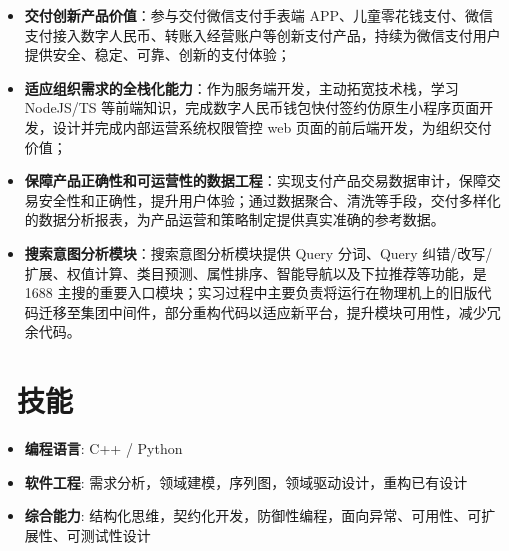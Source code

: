 \documentclass{resume}
\begin{document}
\begin{itemize}
  \item \textbf{交付创新产品价值}：参与交付微信支付手表端 APP、儿童零花钱支付、微信支付接入数字人民币、转账入经营账户等创新支付产品，持续为微信支付用户提供安全、稳定、可靠、创新的支付体验；
  \item \textbf{适应组织需求的全栈化能力}：作为服务端开发，主动拓宽技术栈，学习 NodeJS/TS 等前端知识，完成数字人民币钱包快付签约仿原生小程序页面开发，设计并完成内部运营系统权限管控 web 页面的前后端开发，为组织交付价值；
  \item \textbf{保障产品正确性和可运营性的数据工程}：实现支付产品交易数据审计，保障交易安全性和正确性，提升用户体验；通过数据聚合、清洗等手段，交付多样化的数据分析报表，为产品运营和策略制定提供真实准确的参考数据。
\end{itemize}

\begin{itemize}
  \item \textbf{搜索意图分析模块}：搜索意图分析模块提供 Query 分词、Query 纠错/改写/扩展、权值计算、类目预测、属性排序、智能导航以及下拉推荐等功能，是 1688 主搜的重要入口模块；实习过程中主要负责将运行在物理机上的旧版代码迁移至集团中间件，部分重构代码以适应新平台，提升模块可用性，减少冗余代码。
\end{itemize}

\section{\faCogs\ 技能}
\begin{itemize}[parsep=0.5ex]
  \item \textbf{编程语言}: C++ / Python
  \item \textbf{软件工程}: 需求分析，领域建模，序列图，领域驱动设计，重构已有设计
  \item \textbf{综合能力}: 结构化思维，契约化开发，防御性编程，面向异常、可用性、可扩展性、可测试性设计
\end{itemize}

\end{document}

